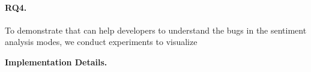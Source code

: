 \paragraph{RQ4.} To demonstrate that \tool can help developers to understand the bugs in the sentiment analysis modes, we conduct experiments to visualize 




%








\noindent\textbf{Implementation Details.}












